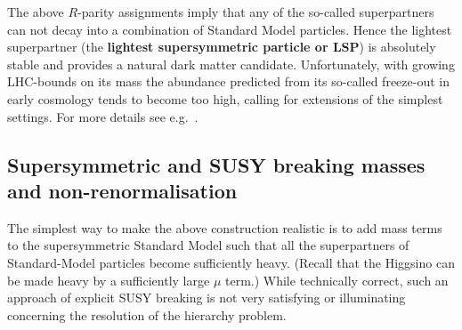 \documentclass[12pt]{article}
\numberwithin{equation}{section}
\begin{document}
The above $R$-parity assignments imply that any of the so-called superpartners can not decay into a combination of Standard Model particles. Hence the lightest superpartner (the {\bf lightest supersymmetric particle or LSP}) is absolutely stable and provides a natural dark matter candidate. Unfortunately, with growing LHC-bounds on its mass the abundance predicted from its so-called freeze-out in early cosmology tends to become too high, calling for extensions of the simplest settings. For more details see e.g.~\cite{Plehn:2017fdg, bertone, Hooper:2009zm, Olive:2003iq}.





\subsection{Supersymmetric and SUSY breaking masses and non-re\-nor\-ma\-lisation}
The simplest way to make the above construction realistic is to add mass terms to the supersymmetric Standard Model such that all the superpartners of Standard-Model particles become sufficiently heavy. (Recall that the Higgsino can be made heavy by a sufficiently large $\mu$ term.) While technically correct, such an approach of explicit SUSY breaking is not very satisfying or illuminating concerning the resolution of the hierarchy problem.
\end{document}
